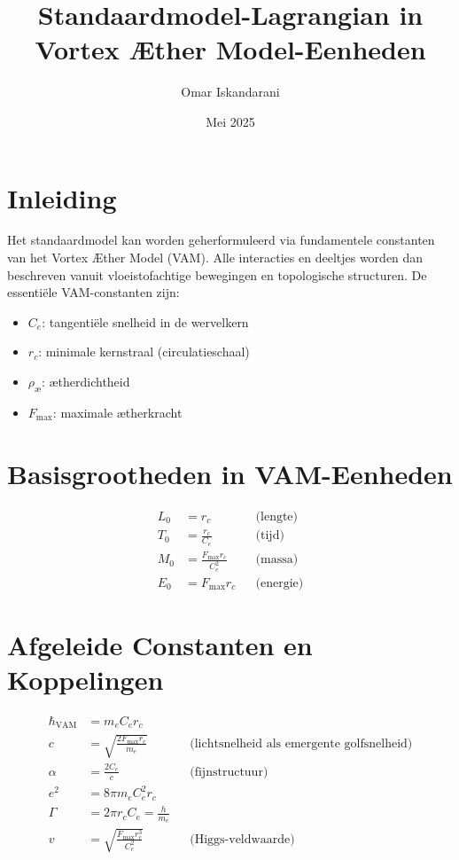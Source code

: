 \documentclass{article}
\title{Standaardmodel-Lagrangian in Vortex Æther Model-Eenheden}
\author{Omar Iskandarani}
\date{Mei 2025}
\begin{document}
    \maketitle

    \section{Inleiding}
    Het standaardmodel kan worden geherformuleerd via fundamentele constanten van het Vortex Æther Model (VAM). Alle interacties en deeltjes worden dan beschreven vanuit vloeistofachtige bewegingen en topologische structuren. De essentiële VAM-constanten zijn:
    \begin{itemize}
        \item $C_e$: tangentiële snelheid in de wervelkern
        \item $r_c$: minimale kernstraal (circulatieschaal)
        \item $\rho_\text{\ae}$: ætherdichtheid
        \item $F_\text{max}$: maximale ætherkracht
    \end{itemize}

    \section{Basisgrootheden in VAM-Eenheden}
    \begin{align*}
        L_0 &= r_c &&\text{(lengte)} \\
        T_0 &= \frac{r_c}{C_e} &&\text{(tijd)} \\
        M_0 &= \frac{F_\text{max} r_c}{C_e^2} &&\text{(massa)} \\
        E_0 &= F_\text{max} r_c &&\text{(energie)}
    \end{align*}

    \section{Afgeleide Constanten en Koppelingen}
    \begin{align*}
        \hbar_\text{VAM} &= m_e C_e r_c \\
        c &= \sqrt{\frac{2 F_\text{max} r_c}{m_e}} &&\text{(lichtsnelheid als emergente golfsnelheid)} \\
        \alpha &= \frac{2 C_e}{c} &&\text{(fijnstructuur)} \\
        e^2 &= 8\pi m_e C_e^2 r_c \\
        \Gamma &= 2\pi r_c C_e = \frac{h}{m_e} \\
        v &= \sqrt{\frac{F_\text{max} r_c^3}{C_e^2}} &&\text{(Higgs-veldwaarde)}
    \end{align*}
\end{document}
